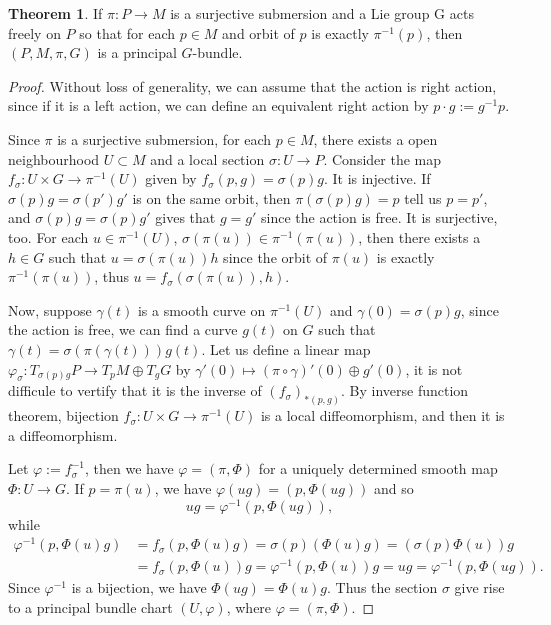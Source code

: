 \documentclass[11pt]{article}
\theoremstyle{definition}
\newtheorem{thm}[para]{Theorem}
\begin{document}
\begin{thm}
If $\pi:P\to M$ is a surjective submersion and a Lie group G acts freely on $P$ so that for each $p\in M$ and orbit of $p$ is exactly $\pi^{-1}(p)$, then $(P,M,\pi,G)$ is a principal $G$-bundle.
\end{thm}

\begin{proof}
	Without loss of generality, we can assume that the action is right action, since if it is a left action, we can define an equivalent right action by $p\cdot g:=g^{-1}p$.
	
	Since $\pi$ is a surjective submersion, for each $p\in M$, there exists a open neighbourhood $U\subset M$ and a local section $\sigma:U\to P$. Consider the map $f_\sigma:U\times G\to \pi^{-1}(U)$ given by $f_\sigma(p,g)=\sigma(p)g$. It is injective. If $\sigma(p)g=\sigma(p')g'$ is on the same orbit, then $\pi(\sigma(p)g)=p$ tell us $p=p'$, and $\sigma(p)g=\sigma(p)g'$ gives that $g=g'$ since the action is free. It is surjective, too. For each $u\in \pi^{-1}(U)$, $\sigma(\pi(u))\in \pi^{-1}(\pi(u))$, then there exists a $h\in G$ such that $u = \sigma(\pi(u))h$ since the orbit of $\pi(u)$ is exactly $\pi^{-1}(\pi(u))$, thus $u= f_\sigma(\sigma(\pi(u)),h)$.
	
	Now, suppose $\gamma(t)$ is a smooth curve on $\pi^{-1}(U)$ and $\gamma(0)=\sigma(p)g$, since the action is free, we can find a curve $g(t)$ on $G$ such that $\gamma(t)=\sigma(\pi(\gamma(t)))g(t)$. Let us define a linear map $\varphi_\sigma: T_{\sigma(p)g}P\to T_{p}M\oplus T_{g}G$ by $\gamma'(0) \mapsto (\pi\circ \gamma)'(0)\oplus g'(0)$, it is not difficule to vertify that it is the inverse of $(f_\sigma)_{*(p,g)}$. By inverse function theorem, bijection $f_\sigma:U\times G\to \pi^{-1}(U)$ is a local diffeomorphism, and then it is a diffeomorphism.
	
	Let $\varphi:=f_\sigma^{-1}$, then we have $\varphi=(\pi,\Phi)$ for a uniquely determined smooth map $\Phi:U\to G$. If $p=\pi(u)$, we have $\varphi(ug)=(p,\Phi(ug))$ and so
	\[
		ug=\varphi^{-1}(p,\Phi(ug)),
	\]
	while
	\[
	\begin{aligned}
		\varphi^{-1}(p,\Phi(u)g)&=f_\sigma(p,\Phi(u)g)=\sigma(p)(\Phi(u)g)=(\sigma(p)\Phi(u))g\\
		&=f_\sigma(p,\Phi(u))g=\varphi^{-1}(p,\Phi(u))g=ug=\varphi^{-1}(p,\Phi(ug)).
	\end{aligned}
	\]
	Since $\varphi^{-1}$ is a bijection, we have $\Phi(ug)=\Phi(u)g$. Thus the 	section $\sigma$ give rise to a principal bundle chart $(U,\varphi)$, where $\varphi=(\pi,\Phi)$.
\end{proof}
\end{document}

